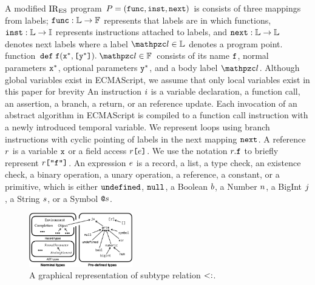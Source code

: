 A modified ${\text{IR}_\text{ES}}$ program $P = (\mathtt{func}, \mathtt{inst}, \mathtt{next})$ is consists
of three mappings from labels;  $\mathtt{func}: \mathbb{L} \rightarrow \mathbb{F}$
represents that labels are in which functions, $\mathtt{inst}: \mathbb{L} \rightarrow
\mathbb{I}$ represents instructions attached to labels, and $\mathtt{next}: \mathbb{L}
\rightarrow \mathbb{L}$ denotes next labels where a label $\lab \in \labset$
denotes a program point.  function $\kwdef \; \f (\x^*, \kwsl \y^* \kwsr). \;
\lab \in \funcset$ consists of its name $\texttt{f}$, normal parameters $\texttt{x}^*$, optional
parameters $\texttt{y}^*$, and a body label $\lab$.  Although global variables exist in
ECMAScript, we assume that only local variables exist in this paper for brevity
An instruction $i$ is a variable declaration, a function call, an assertion,
a branch, a return, or an reference update.  Each invocation of an abstract
algorithm in ECMAScript is compiled to a function call instruction with a newly
introduced temporal variable.  We represent loops using branch instructions with
cyclic pointing of labels in the next mapping $\mathtt{next}$.  A reference $r$
is a variable $\texttt{x}$ or a field access $r \texttt{[} e \texttt{]}$.  We use the
notation $r.\texttt{f}$ to briefly represent $r \texttt{[} \texttt{"f"} \texttt{]}$. An
expression $e$ is a record, a list, a type check, an existence check, a
binary operation, a unary operation, a reference, a constant, or a primitive,
which is either $\texttt{undefined}$, $\texttt{null}$, a Boolean $b$, a Number $n$, a
BigInt $j$, a String $s$, or a Symbol $\texttt{@}s$.

\begin{figure}
  \centering
  \includegraphics[width=0.4\textwidth]{img/subtype}
  \vspace*{-1.5em}
  \caption{A graphical representation of subtype relation $<:$.}
  \label{fig:subtype}
  \vspace*{-1.5em}
\end{figure}

